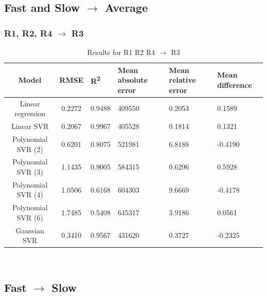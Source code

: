 \documentclass[a4paper,11pt]{article}
\begin{document}
\subsection{Fast and Slow $\rightarrow$ Average}
\subsubsection{R1, R2, R4 $\rightarrow$ R3}
\begin{table}[H]
	\centering
	\begin{adjustbox}{center}
		\begin{tabular}{c | c M{1.2cm} M{2.5cm} M{2.5cm} M{1.8cm}}
			Model & RMSE & R\textsuperscript{2} & Mean absolute error & Mean relative error & Mean difference \tabularnewline
			\hline
			Linear regression & 0.2272 & 0.9488 & 409550 & 0.2053 & 0.1589 \\
			Linear SVR & 0.2067 & 0.9967 & 405528 & 0.1814 & 0.1321 \\
			Polynomial SVR (2) & 0.6201 & 0.8075 & 521981 & 6.8188 & -0.4190 \\
			Polynomial SVR (3) & 1.1435 & 0.9005 & 584315 & 0.6296 & 0.5928 \\
			Polynomial SVR (4) & 1.0506 & 0.6168 & 604303 & 9.6669 & -0.4178 \\
			Polynomial SVR (6) & 1.7485 & 0.5408 & 645317 & 3.9186 & 0.0561 \\
			Gaussian SVR & 0.3410 & 0.9567 & 431620 & 0.3727 & -0.2325 \\
		\end{tabular}
	\end{adjustbox}
	\\
	\caption{Results for R1 R2 R4 $\rightarrow$ R3 }
	\label{tab:query_comp_005}
\end{table}

\subsection{Fast $\rightarrow$ Slow}
\end{document}
